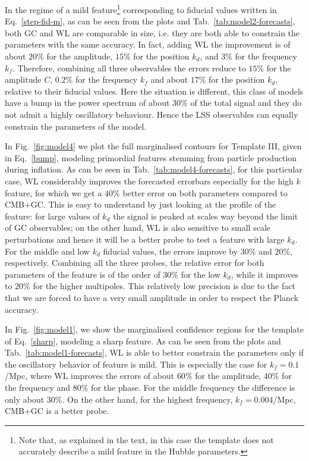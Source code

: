 \documentclass[12pt]{article}
\begin{document}
In the regime of a mild feature\footnote{Note that, as explained in the text, in this case the template does not accurately describe a mild feature in the Hubble parameters.} corresponding to fiducial values written in Eq.~\eqref{step-fid-m}, as can be seen from the plots and Tab.~\ref{tab:model2-forecasts}, both GC and WL are comparable in size, i.e. they are both able to constrain the parameters with the same accuracy. In fact, adding WL the improvement is of about $20\%$ for the amplitude, $15\%$ for the position $k_d$, and $3\%$ for the frequency $k_f$. Therefore, combining all three observables the errors reduce to $15\%$ for the amplitude $C$, $0.2\%$ for the frequency $k_f$ and about $17\%$ for the position $k_d$, relative to their fiducial values. Here the situation is different, this class of models have a bump in the power spectrum of about $30\%$ of the total signal and they do not admit a highly oscillatory behaviour. Hence the LSS observables can equally constrain the parameters of the model. 

 
In Fig.~\ref{fig:model4} we plot the full marginalised contours for Template III, given in Eq.~\eqref{bump}, modeling primordial features stemming from particle production during inflation. As can be seen in Tab.~\ref{tab:model4-forecasts}, for this particular case, WL considerably improves the forecasted errorbars especially for the high $k$ feature, for which we get a $40\%$ better error on both parameters compared to CMB+GC. This is easy to understand by just looking at the profile of the feature: for large values of $k_d$ the signal is peaked at scales way beyond the limit of GC observables; on the other hand, WL is also sensitive to small scale perturbations and hence it will be a better probe to test a feature with large $k_d$. For the middle and low $k_d$ fiducial values, the errors improve by $30\%$ and $20\%$, respectively. Combining all the three probes, the relative error for both parameters of the feature is of the order of $30\%$ for the low $k_d$, while it improves to $20\%$ for the higher multipoles. This relatively low precision is due to the fact that we are forced to have a very small amplitude in order to respect the Planck accuracy.

In Fig.~\ref{fig:model1}, we show the marginalised confidence regions for the template of Eq.~\eqref{sharp}, modeling a sharp feature.
As can be seen from the plots and Tab.~\ref{tab:model1-forecasts}, WL is able to better constrain the parameters only if the oscillatory behavior of feature is mild. 
This is especially the case for $k_f = 0.1$/Mpc,  where WL improves the errors of about $60\%$ for the amplitude, $40\%$ for the frequency and $80\%$ for the phase.  For the middle frequency the difference is only about $30\%$. On the other hand, for the highest frequency, $k_f = 0.004$/Mpc, CMB+GC is a better probe.
\end{document}

